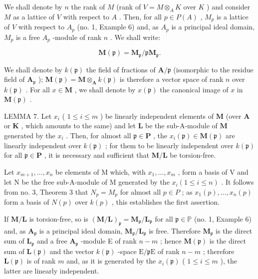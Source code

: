 We shall denote by \(n\) the rank of \(M\) (rank of \(V = M \otimes_{A} K\) over \(K\) ) and consider \(M\) as a lattice of \(V\) with respect to \(A\) . Then, for all \(p \in P(A)\) , \(M_p\) is a lattice of \(V\) with respect to \(A_p\) (no. 1, Example 6) and, as \(A_p\) is a principal ideal domain, \(M_p\) is a free \(A_p\) -module of rank \(n\) . We shall write:

\[
\mathbf {M} (\mathfrak {p}) = \mathbf {M} _ {\mathfrak {p}} / \mathfrak {p} \mathbf {M} _ {\mathfrak {p}}.
\]

We shall denote by \(k(\mathfrak{p})\) the field of fractions of \(\mathbf{A} / \mathfrak{p}\) (isomorphic to the residue field of \(\mathbf{A}_{\mathfrak{p}}\) ); \(\mathbf{M}(\mathfrak{p}) = \mathbf{M} \otimes_{\mathbf{A}} k(\mathfrak{p})\) is therefore a vector space of rank \(n\) over \(k(\mathfrak{p})\) . For all \(x \in \mathbf{M}\) , we shall denote by \(x(\mathfrak{p})\) the canonical image of \(x\) in \(\mathbf{M}(\mathfrak{p})\) .

LEMMA 7. Let \(x_{i}\) ( \(1 \leqslant i \leqslant m\) ) be linearly independent elements of \(\mathbf{M}\) (over \(\mathbf{A}\) or \(\mathbf{K}\) , which amounts to the same) and let \(\mathbf{L}\) be the sub-A-module of \(\mathbf{M}\) generated by the \(x_{i}\) . Then, for almost all \(\mathfrak{p} \in \mathbf{P}\) , the \(x_{i}(\mathfrak{p}) \in \mathbf{M}(\mathfrak{p})\) are linearly independent over \(k(\mathfrak{p})\) ; for them to be linearly independent over \(k(\mathfrak{p})\) for all \(\mathfrak{p} \in \mathbf{P}\) , it is necessary and sufficient that \(\mathbf{M}/\mathbf{L}\) be torsion-free.

Let \(x_{m+1}, \ldots, x_n\) be elements of M which, with \(x_1, \ldots, x_m\) , form a basis of V and let N be the free sub-A-module of M generated by the \(x_i (1 \leqslant i \leqslant n)\) . It follows from no. 3, Theorem 3 that \(N_p = M_p\) for almost all \(p \in P\) ; as \(x_1(p), \ldots, x_n(p)\) form a basis of \(N(p)\) over \(k(p)\) , this establishes the first assertion.

If \(\mathbf{M} / \mathbf{L}\) is torsion-free, so is \((\mathbf{M} / \mathbf{L})_{\mathfrak{p}} = \mathbf{M}_{\mathfrak{p}} / \mathbf{L}_{\mathfrak{p}}\) for all \(\mathfrak{p} \in \mathbb{P}\) (no. 1, Example 6) and, as \(\mathbf{A}_{\mathfrak{p}}\) is a principal ideal domain, \(\mathbf{M}_{\mathfrak{p}} / \mathbf{L}_{\mathfrak{p}}\) is free. Therefore \(\mathbf{M}_{\mathfrak{p}}\) is the direct sum of \(\mathbf{L}_{\mathfrak{p}}\) and a free \(\mathbf{A}_{\mathfrak{p}}\) -module E of rank \(n - m\) ; hence \(\mathbf{M}(\mathfrak{p})\) is the direct sum of \(\mathbf{L}(\mathfrak{p})\) and the vector \(k(\mathfrak{p})\) -space \(\mathrm{E} / \mathfrak{p}\mathrm{E}\) of rank \(n - m\) ; therefore \(\mathbf{L}(\mathfrak{p})\) is of rank \(m\) and, as it is generated by the \(x_{i}(\mathfrak{p})\) ( \(1 \leqslant i \leqslant m\) ), the latter are linearly independent.

